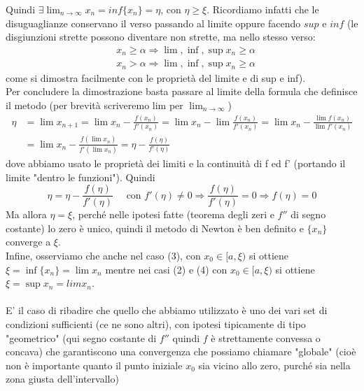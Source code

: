\documentclass[12pt]{article}
\begin{document}
Quindi $ \exists \lim_{n \to \infty} x_n = inf\{x_n\} = \eta $, con $\eta \geq \xi$. Ricordiamo infatti che le disuguaglianze conservano il verso passando al limite oppure facendo $sup$ e $inf$ (le disgiunzioni strette possono diventare non strette, ma nello stesso verso:
\begin{equation*}
\begin{split}
	& x_n \geq \alpha \Rightarrow \lim, \inf, \sup x_n \geq \alpha \\ &
	x_n > \alpha \Rightarrow \lim, \inf, \sup x_n \geq \alpha
\end{split}
\end{equation*}
come si dimostra facilmente con le proprietà del limite e di sup e inf).\\
Per concludere la dimostrazione basta passare al limite della formula che definisce il metodo (per brevità scriveremo lim per $ \lim_{n \to \infty} $)
\begin{equation*}
\begin{split}
	\eta & = \lim x_{n+1} = \lim x_n - \frac{f(x_n)}{f'(x_n)}
	= \lim x_n - \lim\frac{f(x_n)}{f'(x_n)} 
	= \lim x_n - \frac{\lim f(x_n)}{\lim f'(x_n)} \\ &
	= \lim x_n - \frac{f(\lim x_n)}{f'(\lim x_n)} 
	= \eta - \frac{f(\eta)}{f'(\eta)}
\end{split}
\end{equation*}
dove abbiamo usato le proprietà dei limiti e la continuità di f ed f' (portando il limite "dentro le funzioni"). Quindi 
\begin{equation*}
	\eta=\eta-\frac{f(\eta)}{f'(\eta)} \quad \text{ con } f'(\eta) \neq 0 \Rightarrow \frac{f(\eta)}{f'(\eta)} = 0 \Rightarrow f(\eta)=0
\end{equation*}
Ma allora $\eta=\xi$, perché nelle ipotesi fatte (teorema degli zeri e $f''$ di segno costante) lo zero è unico, quindi il metodo di Newton è ben definito e $\{x_n\}$ converge a $\xi$.\\
Infine, osserviamo che anche nel caso (3), con $x_0 \in [a,\xi)$ si ottiene $\xi= \inf\{x_n\}=\lim x_n$ mentre nei casi (2) e (4) con $x_0 \in [a,\xi)$ si ottiene $\xi= \sup x_n=lim x_n.$ \\\\
E' il caso di ribadire che quello che abbiamo utilizzato è uno dei vari set di condizioni sufficienti (ce ne sono altri), con ipotesi tipicamente di tipo "geometrico" (qui segno costante di $f''$ quindi $f$ è strettamente convessa o concava) che garantiscono una convergenza che possiamo chiamare "globale" (cioè non è importante quanto il punto iniziale $x_0$ sia vicino allo zero, purché sia nella zona giusta dell'intervallo)\\
\end{document}
